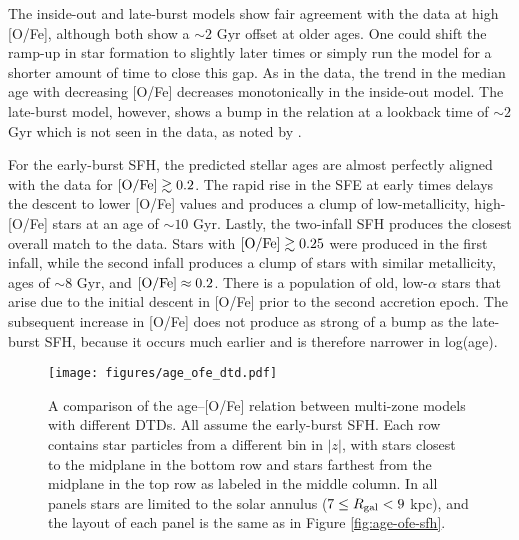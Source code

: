 \documentclass[twocolumn,twocolappendix,linenumbers]{aastex631}
\begin{document}
The inside-out and late-burst models show fair agreement with the data at high [O/Fe], although both show a $\sim2$ Gyr offset at older ages. One could shift the ramp-up in star formation to slightly later times or simply run the model for a shorter amount of time to close this gap. As in the data, the trend in the median age with decreasing [O/Fe] decreases monotonically in the inside-out model. The late-burst model, however, shows a bump in the relation at a lookback time of $\sim2$ Gyr which is not seen in the data, as noted by . 

For the early-burst SFH, the predicted stellar ages are almost perfectly aligned with the data for ${\rm [O/Fe]}\gtrsim 0.2$. The rapid rise in the SFE at early times delays the descent to lower [O/Fe] values and produces a clump of low-metallicity, high-[O/Fe] stars at an age of $\sim10$ Gyr. 
Lastly, the two-infall SFH produces the closest overall match to the data. Stars with ${\rm [O/Fe]}\gtrsim 0.25$ were produced in the first infall, while the second infall produces a clump of stars with similar metallicity, ages of $\sim8$ Gyr, and ${\rm [O/Fe]}\approx0.2$. There is a population of old, low-$\alpha$ stars that arise due to the initial descent in [O/Fe] prior to the second accretion epoch. The subsequent increase in [O/Fe] does not produce as strong of a bump as the late-burst SFH, because it occurs much earlier and is therefore narrower in log(age).

\begin{figure*}
    \centering
    \texttt{[image: figures/age\_ofe\_dtd.pdf]}
    \caption{A comparison of the age--[O/Fe] relation between multi-zone models with different DTDs. All assume the early-burst SFH. Each row contains star particles from a different bin in $|z|$, with stars closest to the midplane in the bottom row and stars farthest from the midplane in the top row as labeled in the middle column. In all panels stars are limited to the solar annulus ($7\leq R_{\rm gal}<9$ kpc), and the layout of each panel is the same as in Figure \ref{fig:age-ofe-sfh}.}
    \label{fig:age-ofe-dtd}
\end{figure*}
\end{document}
